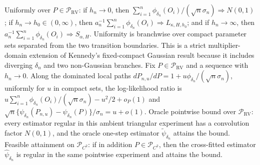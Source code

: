Uniformly over \(P\in\mathcal P_{\mathrm{RV}}\): if \(h_n\to0\), then \(\sum_{i=1}^n\phi_{\delta_n}(O_i)/(\sqrt n\sigma_n)\Rightarrow N(0,1)\); if \(h_n\to h_0\in(0,\infty)\), then \(a_n^{-1}\sum_{i=1}^n\phi_{\delta_n}(O_i)\Rightarrow L_{\kappa,H,h_0}\); and if \(h_n\to\infty\), then \(a_n^{-1}\sum_{i=1}^n\phi_{\delta_n}(O_i)\Rightarrow S_{\alpha,H}\). Uniformity is branchwise over compact parameter sets separated from the two transition boundaries. This is a strict multiplier-domain extension of Kennedy's fixed-compact Gaussian result because it includes diverging \(\delta_n\) and two non-Gaussian branches.
Fix \(P\in\mathcal P_{\mathrm{RV}}\) and a sequence with \(h_n\to0\). Along the dominated local paths \(dP_{n,u}/dP=1+u\phi_{\delta_n}/(\sqrt n\sigma_n)\), uniformly for \(u\) in compact sets, the log-likelihood ratio is \(u\sum_{i=1}^n\phi_{\delta_n}(O_i)/(\sqrt n\sigma_n)-u^2/2+o_P(1)\) and \(\sqrt n\{\psi_{\delta_n}(P_{n,u})-\psi_{\delta_n}(P)\}/\sigma_n=u+o(1)\). Oracle pointwise bound over \(\mathcal P_{\mathrm{RV}}\): every estimator regular in this ambient triangular experiment has a convolution factor \(N(0,1)\), and the oracle one-step estimator \(\widetilde\psi_{\delta_n}\) attains the bound. Feasible attainment on \(\mathcal P_{C^2}\): if in addition \(P\in\mathcal P_{C^2}\), then the cross-fitted estimator \(\widehat\psi_{\delta_n}\) is regular in the same pointwise experiment and attains the bound.
